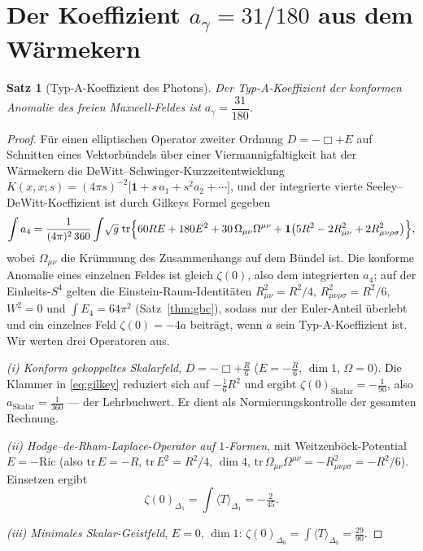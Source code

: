 \documentclass[11pt,a4paper]{article}
\newtheorem{theorem}{Satz}
\theoremstyle{definition}
\theoremstyle{remark}
\newcommand{\ag}{a_\gamma}
\newcommand{\avg}[1]{\langle #1\rangle}
\begin{document}
\section{Der Koeffizient $\ag=31/180$ aus dem Wärmekern}\label{sec:heat}
\begin{theorem}[Typ-A-Koeffizient des Photons]\label{thm:agamma}
Der Typ-A-Koeffizient der konformen Anomalie des freien Maxwell-Feldes ist $\ag=\dfrac{31}{180}$.
\end{theorem}
\begin{proof}
Für einen elliptischen Operator zweiter Ordnung $D=-\Box+E$ auf Schnitten eines Vektorbündels über
einer Viermannigfaltigkeit hat der Wärmekern die DeWitt--Schwinger-Kurzzeitentwicklung
$K(x,x;s)=(4\pi s)^{-2}\bigl[\mathbf 1+s\,a_1+s^2 a_2+\cdots\bigr]$, und der integrierte vierte
Seeley--DeWitt-Koeffizient ist durch Gilkeys Formel gegeben \cite{Gilkey}
\begin{equation}\label{eq:gilkey}
\int a_4=\frac{1}{(4\pi)^2\,360}\int\!\sqrt g\;\mathrm{tr}\Bigl\{60RE+180E^2+30\,\Omega_{\mu\nu}\Omega^{\mu\nu}
+\mathbf 1\bigl(5R^2-2R_{\mu\nu}^2+2R_{\mu\nu\rho\sigma}^2\bigr)\Bigr\},
\end{equation}
wobei $\Omega_{\mu\nu}$ die Krümmung des Zusammenhangs auf dem Bündel ist. Die konforme Anomalie
eines einzelnen Feldes ist gleich $\zeta(0)$, also dem integrierten $a_4$; auf der Einheits-$S^4$
gelten die Einstein-Raum-Identitäten $R_{\mu\nu}^2=R^2/4$, $R_{\mu\nu\rho\sigma}^2=R^2/6$, $W^2=0$
und $\int E_4=64\pi^2$ (Satz~\ref{thm:gbc}), sodass nur der Euler-Anteil überlebt und ein einzelnes
Feld $\zeta(0)=-4a$ beiträgt, wenn $a$ sein Typ-A-Koeffizient ist. Wir werten drei Operatoren aus.

\smallskip
\emph{(i) Konform gekoppeltes Skalarfeld}, $D=-\Box+\tfrac R6$ ($E=-\tfrac R6$, $\dim 1$,
$\Omega=0$). Die Klammer in \eqref{eq:gilkey} reduziert sich auf $-\tfrac16 R^2$ und ergibt
$\zeta(0)_{\mathrm{Skalar}}=-\tfrac1{90}$, also $a_{\mathrm{Skalar}}=\tfrac1{360}$ --- der
Lehrbuchwert. Er dient als Normierungskontrolle der gesamten Rechnung.

\emph{(ii) Hodge--de-Rham-Laplace-Operator auf $1$-Formen}, mit Weitzenböck-Potential
$E=-\mathrm{Ric}$ (also $\mathrm{tr}\,E=-R$, $\mathrm{tr}\,E^2=R^2/4$, $\dim 4$,
$\mathrm{tr}\,\Omega_{\mu\nu}\Omega^{\mu\nu}=-R_{\mu\nu\rho\sigma}^2=-R^2/6$). Einsetzen ergibt
\[
\zeta(0)_{\Delta_1}=\int\avg{T}_{\Delta_1}=-\tfrac{2}{45}.
\]

\emph{(iii) Minimales Skalar-Geistfeld}, $E=0$, $\dim 1$:
$\zeta(0)_{\Delta_0}=\int\avg{T}_{\Delta_0}=\tfrac{29}{90}$.


\end{proof}
\end{document}
